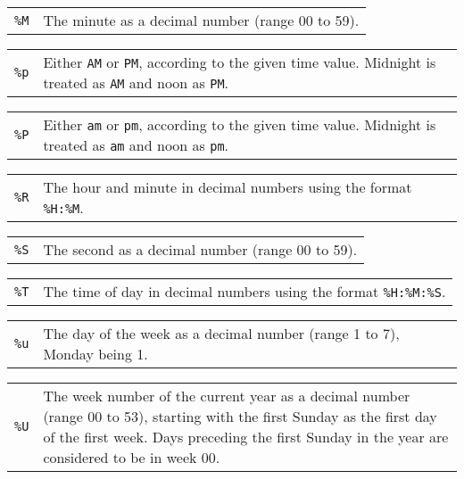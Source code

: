 \documentclass[10pt]{article}
\begin{document}
\medskip

\begin{tabular}{@{}p{20pt}p{298pt}@{}}
{\tt\%M}&The minute as a decimal number (range 00 to 59).\\
\end{tabular}

\medskip

\begin{tabular}{@{}p{20pt}p{298pt}@{}}
{\tt\%p}&Either {\tt AM} or {\tt PM}, according to the given time value.
Midnight is treated as {\tt AM} and noon as {\tt PM}.\\
\end{tabular}

\medskip

\begin{tabular}{@{}p{20pt}p{298pt}@{}}
{\tt\%P}&Either {\tt am} or {\tt pm}, according to the given time value.
Midnight is treated as {\tt am} and noon as {\tt pm}.\\
\end{tabular}

\medskip

\begin{tabular}{@{}p{20pt}p{298pt}@{}}
{\tt\%R}&The hour and minute in decimal numbers using the format
\verb|%H:%M|.\\
\end{tabular}

\medskip

\begin{tabular}{@{}p{20pt}p{298pt}@{}}
{\tt\%S}&The second as a decimal number (range 00 to 59).\\
\end{tabular}

\medskip

\begin{tabular}{@{}p{20pt}p{298pt}@{}}
{\tt\%T}&The time of day in decimal numbers using the format
\verb|%H:%M:%S|.\\
\end{tabular}

\medskip

\begin{tabular}{@{}p{20pt}p{298pt}@{}}
{\tt\%u}&The day of the week as a decimal number (range 1 to 7), Monday
being 1.\\
\end{tabular}

\medskip

\begin{tabular}{@{}p{20pt}p{298pt}@{}}
{\tt\%U}&The week number of the current year as a decimal number (range
00 to 53), starting with the first Sunday as the first day of the first
week. Days preceding the first Sunday in the year are considered to be
in week 00.
\end{tabular}
\end{document}
